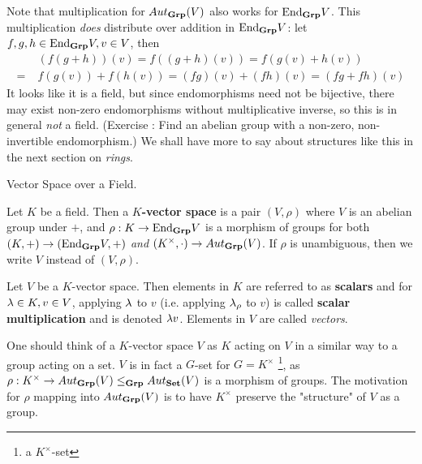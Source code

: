 \documentclass[../../book.tex]{subfiles}
\begin{document}
\begin{rmk}
    Note that multiplication for $Aut_{\mathbf{Grp}}(V)$ also works for $\mathrm{End}_{\mathbf{Grp}}V$.
    This multiplication \emph{does} distribute over addition in $\mathrm{End}_{\mathbf{Grp}}V$: 
    let $f, g, h \in \mathrm{End}_{\mathbf{Grp}}V, v \in V$, then
    \begin{align*}
        &(f(g + h))(v) = f((g+h)(v)) = f(g(v) + h(v)) \\
        =\;& f(g(v)) + f(h(v)) = (fg)(v) + (fh)(v) = (fg + fh)(v)
    \end{align*}
    It looks like it is a field,
    but since endomorphisms need not be bijective, 
    there may exist non-zero endomorphisms without multiplicative inverse,
    so this is in general \emph{not} a field. 
    (Exercise : Find an abelian group with a non-zero, non-invertible endomorphism.)
    We shall have more to say about structures like this 
    in the next section on \emph{rings}. 
\end{rmk}

\begin{dfn} Vector Space over a Field. 

    Let $K$ be a field. 
    Then a \textbf{$K$-vector space} is a pair $(V,\rho)$
    where $V$ is an abelian group under $+$, 
    and $\rho : K \to \mathrm{End}_{\mathbf{Grp}}V$ is a morphism of groups for both
    $(K,+) \to (\mathrm{End}_{\mathbf{Grp}}V,+)$ \emph{and} 
    $(K^\times,\cdot) \to Aut_{\mathbf{Grp}}(V)$.
    If $\rho$ is unambiguous, then we write $V$ instead of $(V,\rho)$. 
    
    Let $V$ be a $K$-vector space. 
    Then elements in $K$ are referred to as \textbf{scalars}
    and for $\lambda \in K, v \in V$, applying $\lambda$ to $v$ 
    (i.e. applying $\lambda_\rho$ to $v$) is called
    \textbf{scalar multiplication} and is denoted $\lambda v$. 
    Elements in $V$ are called \emph{vectors}. 

\end{dfn}

\begin{rmk}
    One should think of a $K$-vector space $V$ as $K$ acting on $V$
    in a similar way to a group acting on a set. 
    $V$ is in fact a $G$-set for $G=K^\times$
    \footnote{a $K^\times$-set}, 
    as $\rho : K^\times \to Aut_{\mathbf{Grp}}(V) \leq_{\mathbf{Grp}} Aut_{\mathbf{Set}}(V)$
    is a morphism of groups. 
    The motivation for $\rho$ mapping into $Aut_{\mathbf{Grp}}(V)$ is
    to have $K^\times$ preserve the "structure" of $V$ as a group. 
\end{rmk}
\end{document}
